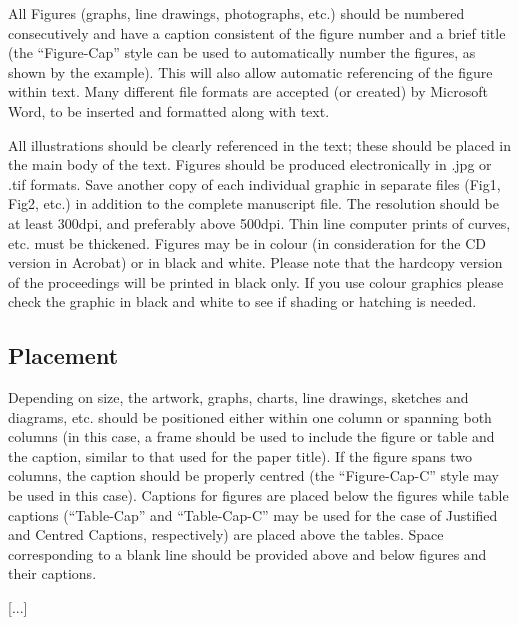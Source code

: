 \documentclass{stabs21}
\begin{document}
\begin{multicols}{2}
All Figures (graphs, line drawings, photographs, etc.) should be
numbered consecutively and have a caption consistent of the figure
number and a brief title (the “Figure-Cap” style can be used to
automatically number the figures, as shown by the example). This will
also allow automatic referencing of the figure within text. Many
different file formats are accepted (or created) by Microsoft Word,
to be inserted and formatted along with text.

All illustrations should be clearly referenced in the text; these
should be placed in the main body of the text.  Figures should be
produced electronically in .jpg or .tif formats. Save another copy of
each individual graphic in separate files (Fig1, Fig2, etc.) in
addition to the complete manuscript file. The resolution should be at
least 300dpi, and preferably above 500dpi. Thin line computer prints
of curves, etc. must be thickened. Figures may be in colour (in
consideration for the CD version in Acrobat) or in black and
white. Please note that the hardcopy version of the proceedings will
be printed in black only. If you use colour graphics please check the
graphic in black and white to see if shading or hatching is needed.

\subsection{Placement}

Depending on size, the artwork, graphs, charts, line drawings,
sketches and diagrams, etc. should be positioned either within one
column or spanning both columns (in this case, a frame should be used
to include the figure or table and the caption, similar to that used
for the paper title). If the figure spans two columns, the caption
should be properly centred (the “Figure-Cap-C” style may be used in
this case). Captions for figures are placed below the figures while
table captions (“Table-Cap” and “Table-Cap-C” may be used for the case
of Justified and Centred Captions, respectively) are placed above the
tables. Space corresponding to a blank line should be provided above
and below figures and their captions.

[...]
\end{multicols}
\end{document}
